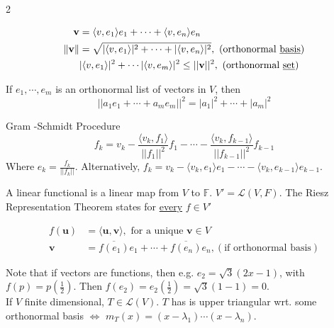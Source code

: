 \documentclass[a4paper,8pt]{extarticle} %
\newcommand{\mybox}[2]{
    \begin{tcolorbox}[colback=lightblue!5!white,colframe=lightblue!75!black,boxsep=1pt,arc=0pt,outer arc=0pt,coltext=black,title={\textcolor{black}{#1}}, before skip=2pt, after skip=2pt]
        #2
    \end{tcolorbox}
}
\begin{document}
\begin{multicols*}{2}
{\begin{subequations}
    \begin{align}
        \mathbf{v} &= \langle v, e_1\rangle e_1 + \dots + \langle v, e_n\rangle e_n \\
        \norm{\mathbf{v}} &= \sqrt{|\langle v, e_1\rangle|^2 + \dots + |\langle v, e_n\rangle|^2}, \text{ (orthonormal \underline{basis})}\\
        &|\langle v, e_1\rangle|^2+\cdots |\langle v, e_m\rangle|^2\leq ||\mathbf{v}||^2, \text{ (orthonormal \underline{set})}
    \end{align}
\end{subequations}

If $e_1,\cdots,e_m$ is an orthonormal list of vectors in $V$, then
\begin{equation}
    ||a_1e_1+\cdots+a_me_m||^2=|a_1|^2+\cdots+|a_m|^2
\end{equation}

Gram -Schmidt Procedure
\begin{equation}
    f_k = v_k-\frac{\langle v_k, f_1\rangle}{||f_1||^2}f_1-\cdots-\frac{\langle v_k, f_{k-1}\rangle}{||f_{k-1}||^2}f_{k-1}
\end{equation}
Where $e_k=\frac{f_k}{||f_k||}$. Alternatively, $f_k = v_k - \langle v_k, e_1\rangle e_1-\cdots-\langle v_k, e_{k-1}\rangle e_{k-1}$.
}

\mybox{Riesz Representation Theorem}{
A linear functional is a linear map from $V$ to $\mathbb{F}$. $V'= \mathcal{L}(V, F)$. The Riesz Representation Theorem states for \underline{every} $f\in V'$

\begin{subequations}
    \begin{align}
    f(\mathbf{u})&=\langle\mathbf{u}, \mathbf{v}\rangle, \text{ for a unique $\mathbf{v} \in V$}\\
    \mathbf{v}&= \overline{f(e_1)}e_1+\cdots+\overline{f(e_n)}e_n, (\text{if orthonormal basis})
    \end{align}
\end{subequations}

Note that if vectors are functions, then e.g. $e_2 = \sqrt{3}(2x-1)$, with $f(p)=p(\frac{1}{2})$. Then $f(e_2)=e_2(\frac{1}{2})=\sqrt{3}(1-1)=0$.\\

If $V$ finite dimensional, $T\in \mathcal{L}(V)$. $T$ has is upper triangular wrt. some orthonormal basis $\Leftrightarrow$ $m_T(x)=(x-\lambda_1)\cdots(x-\lambda_n)$. \\

}
\end{multicols*}
\end{document}
